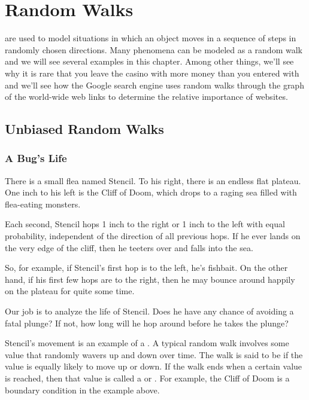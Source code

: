 \chapter{Random Walks}\label{ran_process_chap}

 are used to model situations in which an object
moves in a sequence of steps in randomly chosen directions.  Many
phenomena can be modeled as a random walk and we will see several
examples in this chapter.  Among other things, we'll see why it is
rare that you leave the casino with more money than you entered with
and we'll see how the Google search engine uses random walks through
the graph of the world-wide web links to determine the relative
importance of websites.

\section{Unbiased Random Walks}

\subsection{A Bug's Life}

There is a small flea named Stencil.  To his right, there is an
endless flat plateau.  One inch to his left is the Cliff of Doom,
which drops to a raging sea filled with flea-eating monsters.
%
\begin{figure}[h]
\end{figure}

Each second, Stencil hops 1 inch to the right or 1 inch to the left
with equal probability, independent of the direction of all previous
hops.  If he ever lands on the very edge of the cliff, then he teeters
over and falls into the sea.
%
\begin{figure}[h]
\end{figure}
%
So, for example, if Stencil's first hop is to the left, he's fishbait.
On the other hand, if his first few hops are to the right, then he may
bounce around happily on the plateau for quite some time.

Our job is to analyze the life of Stencil.  Does he have any chance of
avoiding a fatal plunge?  If not, how long will he hop around before
he takes the plunge?

Stencil's movement is an example of a .  A typical
 random walk involves some value that randomly
wavers up and down over time.  The walk is said to be 
if the value is equally likely to move up or down.  If the walk ends
when a certain value is reached, then that value is called a
 or .  For example,
the Cliff of Doom is a boundary condition in the example above.

